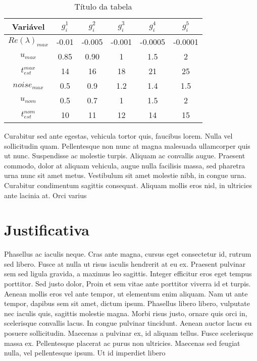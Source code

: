 \documentclass[twoside]{article}
\begin{document}
\begin{multicols}{2}
    \begin{table*}
      \centering
      \caption{Título da tabela}
      \begin{tabular}{cc c c c c}
        \hline
        Variável            & $g_i^1$ & $g_i^2$ & $g_i^3$ & $g_i^4$ & $g_i^5$ \\
        \hline
        $Re(\lambda)_{max}$ & -0.01   & -0.005  & -0.001  & -0.0005 & -0.0001 \\
        $u_{max}$           & 0.85    & 0.90    & 1       & 1.5     & 2       \\
        $t_{est}^{max}$     & 14      & 16      & 18      & 21      & 25      \\
        $noise_{max}$       & 0.5     & 0.9     & 1.2     & 1.4     & 1.5     \\
        $u_{nom}$           & 0.5     & 0.7     & 1       & 1.5     & 2       \\
        $t_{est}^{nom}$     & 10      & 11      & 12      & 14      & 15      \\
        \hline
      \end{tabular}
    \end{table*}

    Curabitur sed ante egestas, vehicula tortor quis, faucibus lorem. Nulla vel sollicitudin quam. Pellentesque non nunc at magna malesuada ullamcorper quis ut nunc. Suspendisse ac molestie turpis. Aliquam ac convallis augue. Praesent commodo, dolor at aliquam vehicula, augue nulla facilisis massa, sed pharetra urna nunc sit amet metus. Vestibulum sit amet molestie nibh, in congue urna. Curabitur condimentum sagittis consequat. Aliquam mollis eros nisl, in ultricies ante lacinia at. Orci varius



    \section{Justificativa}

    Phasellus ac iaculis neque. Cras ante magna, cursus eget consectetur id, rutrum sed libero. Fusce at nulla ut risus iaculis hendrerit at eu ex. Praesent pulvinar sem sed ligula gravida, a maximus leo sagittis. Integer efficitur eros eget tempus porttitor. Sed justo dolor,
    Proin et sem vitae ante porttitor viverra id et turpis. Aenean mollis eros vel ante tempor, ut elementum enim aliquam. Nam ut ante tempor, dapibus sem sit amet, dictum ipsum. Phasellus libero libero, vulputate nec iaculis quis, sagittis molestie magna. Morbi risus justo, ornare quis orci in, scelerisque convallis lacus. In congue pulvinar tincidunt. Aenean auctor lacus eu posuere sollicitudin. Maecenas a pulvinar ex, id aliquam tellus. Fusce scelerisque massa ex. Pellentesque placerat ac purus non ultricies. Maecenas sed feugiat nulla, vel pellentesque ipsum. Ut id imperdiet libero


\end{multicols}
\end{document}
